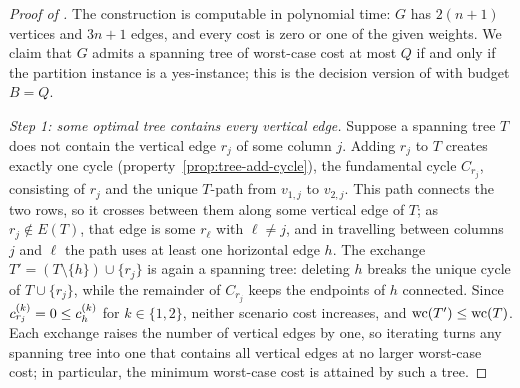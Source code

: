 \begin{proof}[Proof of ]
The construction is computable in polynomial time: $G$ has $2(n + 1)$ vertices and $3n + 1$ edges, and every cost is zero or one of the given weights.
We claim that $G$ admits a spanning tree of worst-case cost at most $Q$ if and only if the partition instance is a yes-instance; this is the decision version of  with budget $B = Q$.

\emph{Step 1: some optimal tree contains every vertical edge.}
Suppose a spanning tree $T$ does not contain the vertical edge $r_j$ of some column $j$.
Adding $r_j$ to $T$ creates exactly one cycle (property~\ref{prop:tree-add-cycle}), the fundamental cycle $C_{r_j}$, consisting of $r_j$ and the unique $T$-path from $v_{1,j}$ to $v_{2,j}$.
This path connects the two rows, so it crosses between them along some vertical edge of $T$; as $r_j \notin E(T)$, that edge is some $r_\ell$ with $\ell \neq j$, and in travelling between columns $j$ and $\ell$ the path uses at least one horizontal edge $h$.
The exchange $T' = (T \setminus \{h\}) \cup \{r_j\}$ is again a spanning tree: deleting $h$ breaks the unique cycle of $T \cup \{r_j\}$, while the remainder of $C_{r_j}$ keeps the endpoints of $h$ connected.
Since $c^{(k)}_{r_j} = 0 \leq c^{(k)}_{h}$ for $k \in \{1, 2\}$, neither scenario cost increases, and $\mathrm{wc}(T') \leq \mathrm{wc}(T)$.
Each exchange raises the number of vertical edges by one, so iterating turns any spanning tree into one that contains all vertical edges at no larger worst-case cost; in particular, the minimum worst-case cost is attained by such a tree.


\end{proof}
